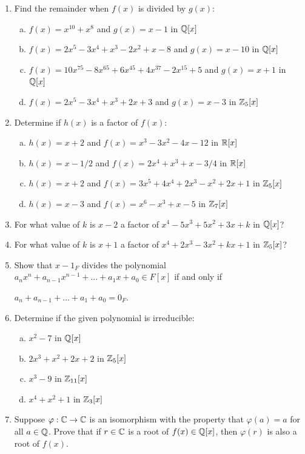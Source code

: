 \documentclass[11pt,fleqn,dvipsnames,usenames]{article}
\begin{document}
\begin{enumerate}[1.]
\item Find the remainder when $f(x)$ is divided by $g(x)$:
\begin{enumerate}[(a)]
\item $f(x) = x^{10} + x^8$ and $g(x) = x -1$ in $\mathbb{Q}[x]$
\item $f(x) = 2x^5 - 3x^4 + x^3 - 2x^2 + x - 8$ and $g(x) = x - 10$ in $\mathbb{Q}[x]$
\item $f(x) = 10x^{75} - 8x^{65} + 6x^{45} + 4x^{37} - 2x^{15} + 5$ and $g(x) = x + 1$ in $\mathbb{Q}[x]$
\item $f(x) = 2x^5 - 3x^4 + x^3 + 2x + 3$ and $g(x) = x - 3$ in $\mathbb{Z}_{5}[x]$
\end{enumerate}

\item Determine if $h(x)$ is a factor of $f(x)$:
\begin{enumerate}[(a)]
\item $h(x) = x + 2$ and $f(x) = x^3 - 3x^2 - 4x - 12$ in $\mathbb{R}[x]$
\item $h(x) = x - 1/2$ and $f(x) = 2x^4 + x^3 + x - 3/4$ in $\mathbb{R}[x]$
\item $h(x) = x + 2$ and $f(x) = 3x^5 + 4x^4 + 2x^3 - x^2 + 2x + 1$ in $\mathbb{Z}_{5}[x]$
\item $h(x) = x - 3$ and $f(x) = x^6 - x^3 + x - 5$ in $\mathbb{Z}_{7}[x]$
\end{enumerate}

\item For what value of $k$ is $x-2$ a factor of $x^4 - 5x^3 + 5x^2 + 3x + k$ in $\mathbb{Q}[x]$?

\item For what value of $k$ is $x+1$ a factor of $x^4 + 2x^3 - 3x^2 + kx + 1$ in $\mathbb{Z}_{5}[x]$?

\item Show that $x -1_{F}$ divides the polynomial $a_{n}x^{n} + a_{n-1}x^{n-1} + \ldots + a_{1}x + a_{0}\in F[x]$ if and only if
\begin{center}
$a_{n} + a_{n-1} + \ldots + a_{1} + a_{0} = 0_{F}$.
\end{center}

\item Determine if the given polynomial is irreducible:
\begin{enumerate}[(a)]
\item $x^2 - 7$ in $\mathbb{Q}[x]$
\item $2x^3 + x^2 + 2x + 2$ in $\mathbb{Z}_{5}[x]$
\item $x^3 - 9$ in $\mathbb{Z}_{11}[x]$
\item $x^4 + x^2 + 1$ in $\mathbb{Z}_{3}[x]$
\end{enumerate}

\item Suppose $\varphi:\mathbb{C}\to\mathbb{C}$ is an isomorphism with the property that $\varphi(a) = a$ for all $a\in \mathbb{Q}$.  Prove that if $r\in\mathbb{C}$ is a root of $f(x)\in \mathbb{Q}[x]$, then $\varphi(r)$ is also a root of $f(x)$.
\end{enumerate}
\end{document}
